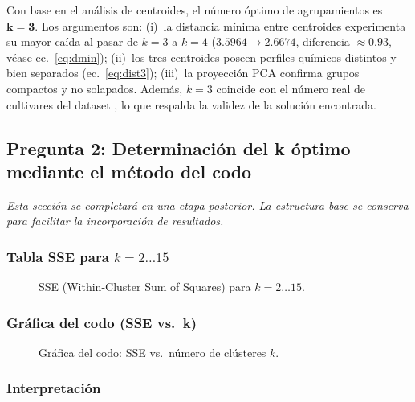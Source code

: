 \documentclass[10pt]{article}
\begin{document}
Con base en el an\'alisis de centroides, el n\'umero \'optimo de agrupamientos es
$\mathbf{k=3}$.
Los argumentos son: (i)~la distancia m\'inima entre centroides experimenta su mayor
ca\'ida al pasar de $k=3$ a $k=4$ ($3.5964 \to 2.6674$, diferencia $\approx 0.93$,
v\'ease ec.~\ref{eq:dmin}); (ii)~los tres centroides poseen perfiles qu\'imicos
distintos y bien separados (ec.~\ref{eq:dist3}); (iii)~la proyecci\'on PCA confirma
grupos compactos y no solapados.
Adem\'as, $k=3$ coincide con el n\'umero real de cultivares del dataset
\citep{forina1991wine}, lo que respalda la validez de la soluci\'on encontrada.

\subsection{Pregunta 2: Determinaci\'on del k \'optimo mediante el m\'etodo del codo}

\textit{Esta secci\'on se completar\'a en una etapa posterior.
La estructura base se conserva para facilitar la incorporaci\'on de resultados.}

\subsubsection{Tabla SSE para $k = 2\ldots15$}

\begin{figure}[H]
  \centering
  \caption{SSE (Within-Cluster Sum of Squares) para $k = 2\ldots15$.}
  \label{tab:sse}
\end{figure}

\subsubsection{Gr\'afica del codo (SSE vs.\ k)}

\begin{figure}[H]
  \centering
  \caption{Gr\'afica del codo: SSE vs.\ n\'umero de cl\'usteres $k$.}
  \label{fig:codo}
\end{figure}

\subsubsection{Interpretaci\'on}
\end{document}
